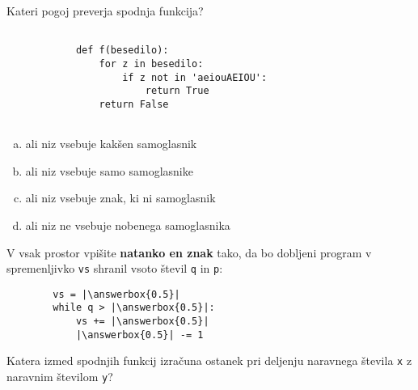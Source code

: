 \documentclass[arhiv, 10pt]{../izpit}
\newcommand{\inlinepy}[1]{\texttt{#1}}
\newcommand{\answerbox}[1]{\framebox{\vphantom{\large M}\hspace{#1cm}}}
\begin{document}
        \naloga*

        \begin{multicols}{2}
        \noindent
        Kateri pogoj preverja spodnja funkcija?
        \begin{verbatim}
        
            def f(besedilo):
                for z in besedilo:
                    if z not in 'aeiouAEIOU':
                        return True
                return False
            
        \end{verbatim}

        \begin{enumerate}[(a)]
\item ali niz vsebuje kakšen samoglasnik
\item ali niz vsebuje samo samoglasnike
\item ali niz vsebuje znak, ki ni samoglasnik
\item ali niz ne vsebuje nobenega samoglasnika
\end{enumerate}

        \end{multicols}
    
        \naloga*
        \begin{multicols}{2}
        \noindent
        V vsak prostor vpišite \textbf{natanko en znak} tako, da bo dobljeni program v spremenljivko \inlinepy{vs} shranil vsoto števil \inlinepy{q} in \inlinepy{p}:
        
        \columnbreak
        \begin{verbatim}
        vs = |\answerbox{0.5}|
        while q > |\answerbox{0.5}|:
            vs += |\answerbox{0.5}|
            |\answerbox{0.5}| -= 1
        \end{verbatim}
        \end{multicols}
    
        \clearpage
        \naloga
        
        Katera izmed spodnjih funkcij izračuna ostanek pri deljenju naravnega števila \inlinepy{x} z naravnim številom \inlinepy{y}?
    
\end{document}
